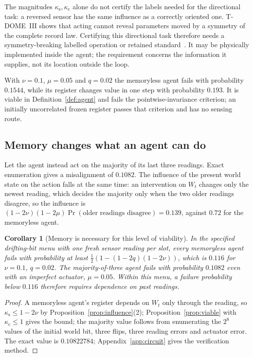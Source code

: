 \documentclass[11pt,a4paper]{article}
\newtheorem{corollary}[definition]{Corollary}
\begin{document}
The magnitudes \(\kappa_{\mathrm s},\kappa_{\mathrm c}\) alone do not
certify the labels needed for the directional task: a reversed sensor has
the same influence as a correctly oriented one. T-DOME~III shows that acting cannot reveal parameters moved by a symmetry of the complete record law. Certifying this directional task therefore needs a symmetry-breaking labelled operation or retained standard~\cite{Liu2026TDOME_III}. It may be physically implemented inside the agent; the requirement concerns the information it supplies, not its location outside the loop.

With $\nu=0.1$, $\mu=0.05$ and $q=0.02$ the memoryless agent fails
with probability $0.1544$, while its register changes value in one step
with probability $0.193$. It is viable in Definition~\ref{def:agent}
and fails the pointwise-invariance criterion; an initially uncorrelated
frozen register passes that criterion and has no sensing route.

\subsection{Memory changes what an agent can do}

Let the agent instead act on the majority of its last three readings. Exact enumeration gives a misalignment of $0.1082$. The influence of the present world state on the action falls at the same time: an intervention on $W_t$ changes only the newest reading, which decides the majority only when the two older readings disagree, so the influence is $(1-2\nu)(1-2\mu)\Pr(\text{older readings disagree})=0.139$, against $0.72$ for the memoryless agent.

\begin{corollary}[Memory is necessary for this level of viability]
\label{cor:memory}
In the specified drifting-bit menu with one fresh sensor reading per slot, every memoryless agent fails with probability at least $\frac12(1-(1-2q)(1-2\nu))$, which is $0.116$ for $\nu=0.1$, $q=0.02$. The majority-of-three agent fails with probability $0.1082$ even with an imperfect actuator, $\mu=0.05$. Within this menu, a failure probability below $0.116$ therefore requires dependence on past readings.
\end{corollary}

\begin{proof}
A memoryless agent's register depends on $W_t$ only through the reading, so $\kappa_{\mathrm s}\le1-2\nu$ by Proposition~\ref{prop:influence}(2); Proposition~\ref{prop:viable} with $\kappa_{\mathrm c}\le1$ gives the bound; the majority value follows from enumerating the \(2^8\) values of the
initial world bit, three flips, three reading errors and actuator error.
The exact value is \(0.10822784\); Appendix~\ref{app:circuit} gives the
verification method.
\end{proof}
\end{document}
